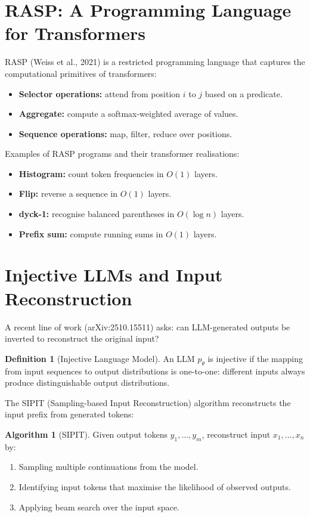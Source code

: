 \documentclass[11pt,a4paper]{book}
\theoremstyle{definition}
\newtheorem{definition}{Definition}[chapter]
\newtheorem{algorithm}{Algorithm}[chapter]
\begin{document}
\section{RASP: A Programming Language for Transformers}

RASP (Weiss et al., 2021) is a restricted programming language that captures the computational primitives of transformers:

\begin{itemize}
	\item \textbf{Selector operations:} attend from position $i$ to $j$ based on a predicate.
	\item \textbf{Aggregate:} compute a softmax-weighted average of values.
	\item \textbf{Sequence operations:} map, filter, reduce over positions.
\end{itemize}

Examples of RASP programs and their transformer realisations:
\begin{itemize}
	\item \textbf{Histogram:} count token frequencies in $O(1)$ layers.
	\item \textbf{Flip:} reverse a sequence in $O(1)$ layers.
	\item \textbf{dyck-1:} recognise balanced parentheses in $O(\log n)$ layers.
	\item \textbf{Prefix sum:} compute running sums in $O(1)$ layers.
\end{itemize}

\section{Injective LLMs and Input Reconstruction}

A recent line of work (arXiv:2510.15511) asks: can LLM-generated outputs be inverted to reconstruct the original input?

\begin{definition}[Injective Language Model]
	An LLM $p_\theta$ is injective if the mapping from input sequences to output distributions is one-to-one: different inputs always produce distinguishable output distributions.
\end{definition}

The SIPIT (Sampling-based Input Reconstruction) algorithm reconstructs the input prefix from generated tokens:

\begin{algorithm}[SIPIT]
	Given output tokens $y_1, \dots, y_m$, reconstruct input $x_1, \dots, x_n$ by:
	\begin{enumerate}
		\item Sampling multiple continuations from the model.
		\item Identifying input tokens that maximise the likelihood of observed outputs.
		\item Applying beam search over the input space.
	\end{enumerate}
\end{algorithm}
\end{document}
